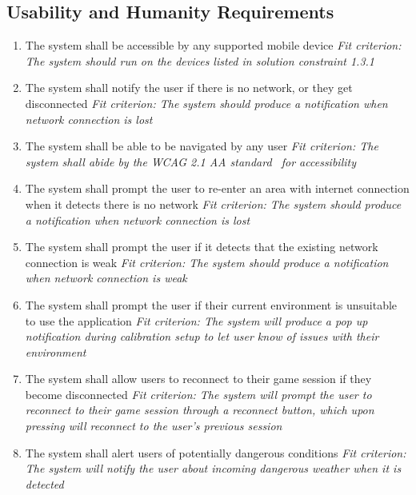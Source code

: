 \documentclass[12pt]{article}
\begin{document}
\subsection{Usability and Humanity Requirements}
\begin{enumerate}[UH\arabic*.]
	\item The system shall be accessible by any supported mobile device\newline
    \textit{Fit criterion: The system should run on the devices listed in solution constraint 1.3.1}
    \item The system shall notify the user if there is no network, or they get disconnected\newline
    \textit{Fit criterion: The system should produce a notification when network connection is lost}
    \item The system shall be able to be navigated by any user\newline
    \textit{Fit criterion: The system shall abide by the WCAG 2.1 AA standard~\citep{WCAG2.1}  for accessibility}
    \item The system shall prompt the user to re-enter an area with internet connection when it detects there is no network\newline
    \textit{Fit criterion: The system should produce a notification when network connection is lost}
    \item The system shall prompt the user if it detects that the existing network connection is weak\newline
    \textit{Fit criterion: The system should produce a notification when network connection is weak}
    \item The system shall prompt the user if their current environment is unsuitable to use the application\newline
    \textit{Fit criterion: The system will produce a pop up notification during calibration setup to let user know of issues with their environment}
    \item The system shall allow users to reconnect to their game session if they become disconnected\newline
    \textit{Fit criterion: The system will prompt the user to reconnect to their game session through a reconnect button, which upon pressing will reconnect to the user's previous session}
    \item The system shall alert users of potentially dangerous conditions \newline
    \textit{Fit criterion: The system will notify the user about incoming dangerous weather when it is detected}
\end{enumerate}
\end{document}
